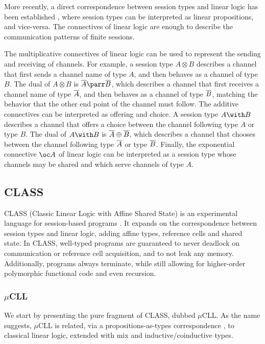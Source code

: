 More recently, a direct correspondence between session types and linear logic has been established \cite{Caires:2010, Wadler:2012, Caires:2012, Caires:2016, Giunti:2016}, where session types can be interpreted as linear propositions, and vice-versa. The connectives of linear logic are enough to describe the communication patterns of finite sessions.

The multiplicative connectives of linear logic can be used to represent the sending and receiving of channels. For example, a session type $A \otimes B$ describes a channel that first sends a channel name of type $A$, and then behaves as a channel of type $B$. The dual of $A \otimes B$ is $\dual{A} \parr \dual{B}$, which describes a channel that first receives a channel name of type $\overline{A}$, and then behaves as a channel of type $\overline{B}$, matching the behavior that the other end point of the channel must follow. The additive connectives can be interpreted as offering and choice. A session type $A \with B$ describes a channel that offers a choice between the channel following type $A$ or type $B$. The dual of $A \with B$ is $\overline{A} \oplus \overline{B}$, which describes a channel that chooses between the channel following type $\overline{A}$ or type $\overline{B}$. Finally, the exponential connective $\oc A$ of linear logic can be interpreted as a session type whose channels may be shared and which serve channels of type $A$.

\subsection{CLASS}

CLASS (Classic Linear Logic with Affine Shared State) is an experimental language for session-based programs \cite{Rocha:2023, Rocha:2022, Rocha:2021}. It expands on the correspondence between session types and linear logic, adding affine types, reference cells and shared state. In CLASS, well-typed programs are guaranteed to never deadlock on communication or reference cell acquisition, and to not leak any memory. Additionally, programs always terminate, while still allowing for higher-order polymorphic functional code and even recursion.

\subsubsection{\texorpdfstring{$\mu$}{mu}CLL}

We start by presenting the pure fragment of CLASS, dubbed $\mu$CLL. As the name suggests, $\mu$CLL is related, via a propositions-as-types correspondence \cite{Caires:2016}, to classical linear logic, extended with mix and inductive/coinductive types.

